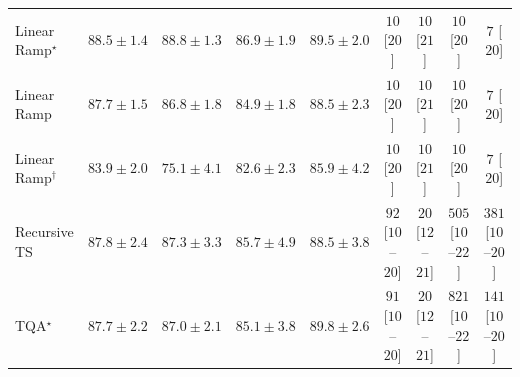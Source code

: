 \begin{tabular}{l|cccc|cccc|}
Linear Ramp$^\star$ & {\cellcolor[HTML]{034E7B}} \color[HTML]{F1F1F1} $88.5\pm 1.4$ & {\cellcolor[HTML]{034C78}} \color[HTML]{F1F1F1} $88.8\pm 1.3$ & {\cellcolor[HTML]{045A8D}} \color[HTML]{F1F1F1} $86.9\pm 1.9$ & {\cellcolor[HTML]{03476F}} \color[HTML]{F1F1F1} $89.5\pm 2.0$ & {\cellcolor[HTML]{FFF7F3}} \color[HTML]{000000} $10$ [$20$] & {\cellcolor[HTML]{FFF7F3}} \color[HTML]{000000} $10$ [$21$] & {\cellcolor[HTML]{FFF7F3}} \color[HTML]{000000} $10$ [$20$] & {\cellcolor[HTML]{FFF7F3}} \color[HTML]{000000} $7$ [$20$] \\
Linear Ramp & {\cellcolor[HTML]{045483}} \color[HTML]{F1F1F1} $87.7\pm 1.5$ & {\cellcolor[HTML]{045A8D}} \color[HTML]{F1F1F1} $86.8\pm 1.8$ & {\cellcolor[HTML]{04639B}} \color[HTML]{F1F1F1} $84.9\pm 1.8$ & {\cellcolor[HTML]{034E7B}} \color[HTML]{F1F1F1} $88.5\pm 2.3$ & {\cellcolor[HTML]{FFF7F3}} \color[HTML]{000000} $10$ [$20$] & {\cellcolor[HTML]{FFF7F3}} \color[HTML]{000000} $10$ [$21$] & {\cellcolor[HTML]{FFF7F3}} \color[HTML]{000000} $10$ [$20$] & {\cellcolor[HTML]{FFF7F3}} \color[HTML]{000000} $7$ [$20$] \\
Linear Ramp$^\dagger$ & {\cellcolor[HTML]{0568A3}} \color[HTML]{F1F1F1} $83.9\pm 2.0$ & {\cellcolor[HTML]{569DC8}} \color[HTML]{F1F1F1} $75.1\pm 4.1$ & {\cellcolor[HTML]{056EAD}} \color[HTML]{F1F1F1} $82.6\pm 2.3$ & {\cellcolor[HTML]{045E94}} \color[HTML]{F1F1F1} $85.9\pm 4.2$ & {\cellcolor[HTML]{FFF7F3}} \color[HTML]{000000} $10$ [$20$] & {\cellcolor[HTML]{FFF7F3}} \color[HTML]{000000} $10$ [$21$] & {\cellcolor[HTML]{FFF7F3}} \color[HTML]{000000} $10$ [$20$] & {\cellcolor[HTML]{FFF7F3}} \color[HTML]{000000} $7$ [$20$] \\
Recursive TS & {\cellcolor[HTML]{045382}} \color[HTML]{F1F1F1} $87.8\pm 2.4$ & {\cellcolor[HTML]{045788}} \color[HTML]{F1F1F1} $87.3\pm 3.3$ & {\cellcolor[HTML]{046096}} \color[HTML]{F1F1F1} $85.7\pm 4.9$ & {\cellcolor[HTML]{034E7B}} \color[HTML]{F1F1F1} $88.5\pm 3.8$ & {\cellcolor[HTML]{FDE4E1}} \color[HTML]{000000} $92$ [$10$--$20$] & {\cellcolor[HTML]{FFF4F0}} \color[HTML]{000000} $20$ [$12$--$21$] & {\cellcolor[HTML]{E13B98}} \color[HTML]{F1F1F1} $505$ [$10$--$22$] & {\cellcolor[HTML]{F87CA8}} \color[HTML]{F1F1F1} $381$ [$10$--$20$] \\
TQA$^\star$ & {\cellcolor[HTML]{045483}} \color[HTML]{F1F1F1} $87.7\pm 2.2$ & {\cellcolor[HTML]{04598C}} \color[HTML]{F1F1F1} $87.0\pm 2.1$ & {\cellcolor[HTML]{04629A}} \color[HTML]{F1F1F1} $85.1\pm 3.8$ & {\cellcolor[HTML]{03456C}} \color[HTML]{F1F1F1} $89.8\pm 2.6$ & {\cellcolor[HTML]{FDE4E1}} \color[HTML]{000000} $91$ [$10$--$20$] & {\cellcolor[HTML]{FFF4F0}} \color[HTML]{000000} $20$ [$12$--$21$] & {\cellcolor[HTML]{4B006A}} \color[HTML]{F1F1F1} $821$ [$10$--$22$] & {\cellcolor[HTML]{FDD8D5}} \color[HTML]{000000} $141$ [$10$--$20$] \\

\end{tabular}
